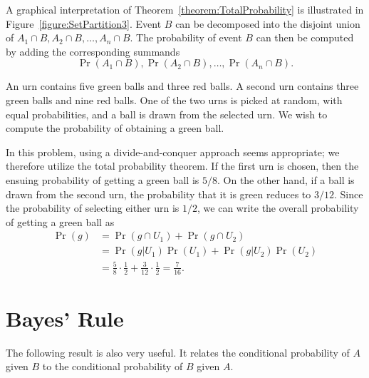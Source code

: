 A graphical interpretation of Theorem~\ref{theorem:TotalProbability} is illustrated in Figure~\ref{figure:SetPartition3}.
Event $B$ can be decomposed into the disjoint union of $A_1 \cap B, A_2 \cap B, \ldots, A_n \cap B$.
The probability of event $B$ can then be computed by adding the corresponding summands
\begin{equation*}
\Pr (A_1 \cap B), \Pr (A_2 \cap B), \ldots, \Pr (A_n \cap B) .
\end{equation*}

\begin{example}
An urn contains five green balls and three red balls.
A second urn contains three green balls and nine red balls.
One of the two urns is picked at random, with equal probabilities, and a ball is drawn from the selected urn.
We wish to compute the probability of obtaining a green ball.

In this problem, using a divide-and-conquer approach seems appropriate;
we therefore utilize the total probability theorem.
If the first urn is chosen, then the ensuing probability of getting a green ball is $5/8$.
On the other hand, if a ball is drawn from the second urn, the probability that it is green reduces to $3/12$.
Since the probability of selecting either urn is $1/2$, we can write the overall probability of getting a green ball as
\begin{equation*}
\begin{split}
\Pr (g) &= \Pr (g \cap U_1) + \Pr (g \cap U_2) \\
&= \Pr (g | U_1) \Pr (U_1) + \Pr (g | U_2) \Pr (U_2) \\
&= \frac{5}{8} \cdot \frac{1}{2} + \frac{3}{12} \cdot \frac{1}{2}
= \frac{7}{16}.
\end{split}
\end{equation*}
\end{example}


\section{Bayes' Rule}

The following result is also very useful.
It relates the conditional probability of $A$ given $B$ to the conditional probability of $B$ given $A$.

